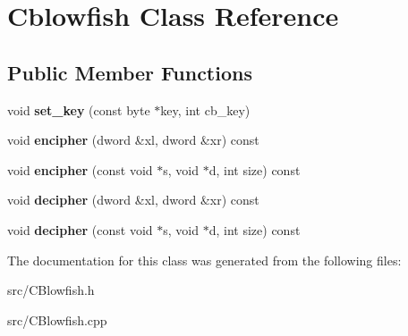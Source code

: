 \hypertarget{class_cblowfish}{
\section{Cblowfish Class Reference}
\label{class_cblowfish}
}
\subsection*{Public Member Functions}
\begin{DoxyCompactItemize}
\item 
\hypertarget{class_cblowfish_a2d45cfdb00c717270044c888fb261b7e}{
void {\bfseries set\_\-key} (const byte $\ast$key, int cb\_\-key)}
\label{class_cblowfish_a2d45cfdb00c717270044c888fb261b7e}

\item 
\hypertarget{class_cblowfish_a6549eb1a1da1717c8581efa27087465d}{
void {\bfseries encipher} (dword \&xl, dword \&xr) const }
\label{class_cblowfish_a6549eb1a1da1717c8581efa27087465d}

\item 
\hypertarget{class_cblowfish_a1d02b0aa090709d9b87745b1ec712ca3}{
void {\bfseries encipher} (const void $\ast$s, void $\ast$d, int size) const }
\label{class_cblowfish_a1d02b0aa090709d9b87745b1ec712ca3}

\item 
\hypertarget{class_cblowfish_a0e1d6c1039284573f94afa0e84e9dc1b}{
void {\bfseries decipher} (dword \&xl, dword \&xr) const }
\label{class_cblowfish_a0e1d6c1039284573f94afa0e84e9dc1b}

\item 
\hypertarget{class_cblowfish_a8de53d9ecdba33cefa752f63df9a4662}{
void {\bfseries decipher} (const void $\ast$s, void $\ast$d, int size) const }
\label{class_cblowfish_a8de53d9ecdba33cefa752f63df9a4662}

\end{DoxyCompactItemize}


The documentation for this class was generated from the following files:\begin{DoxyCompactItemize}
\item 
src/CBlowfish.h\item 
src/CBlowfish.cpp\end{DoxyCompactItemize}
